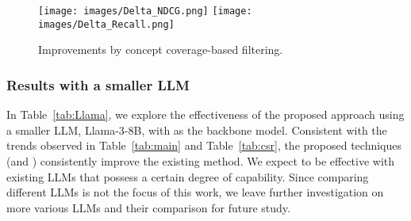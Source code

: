 

\begin{figure}[t]
\centering
\texttt{[image: images/Delta\_NDCG.png]}
\texttt{[image: images/Delta\_Recall.png]}\hspace{-0.1cm}
\caption{Improvements by concept coverage-based filtering.}
\label{fig:filtering}
\end{figure}




\subsubsection{\textbf{Results with a smaller LLM}}
\label{result:Llama}
In Table~\ref{tab:Llama}, we explore the effectiveness of the proposed approach using a smaller LLM, Llama-3-8B, with \ctr as the backbone model. 
Consistent with the trends observed in Table~\ref{tab:main} and Table~\ref{tab:csr}, the proposed techniques (\proposed and \proposedtwo) consistently improve the existing method.
We expect \proposed to be effective with existing LLMs that possess a certain degree of capability. 
Since comparing different LLMs is not the focus of this work, we leave further investigation on more various LLMs and their comparison for future study.



